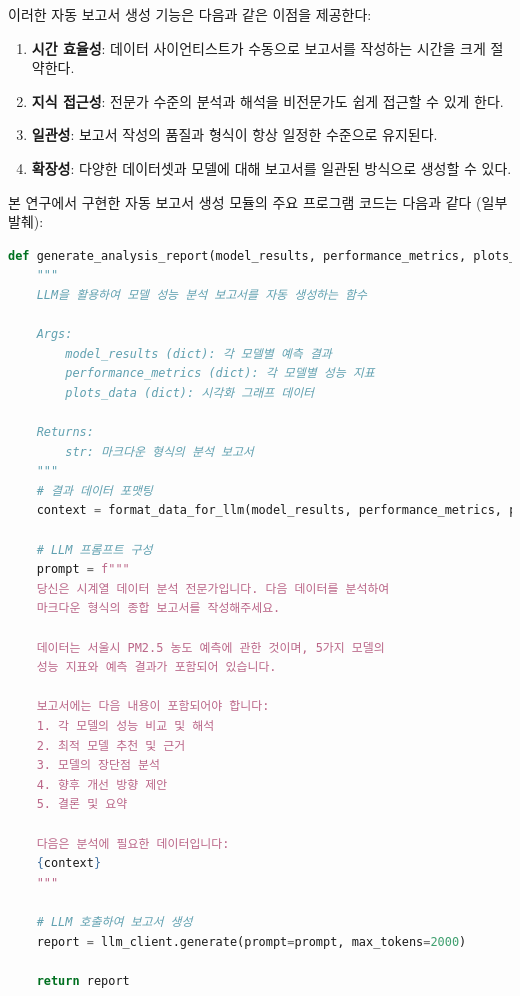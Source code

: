 \documentclass[12pt,ko,a4,]{report}
\begin{document}
이러한 자동 보고서 생성 기능은 다음과 같은 이점을 제공한다:

\begin{enumerate}
\def\labelenumi{\arabic{enumi}.}
\item
  \textbf{시간 효율성}: 데이터 사이언티스트가 수동으로 보고서를 작성하는
  시간을 크게 절약한다.
\item
  \textbf{지식 접근성}: 전문가 수준의 분석과 해석을 비전문가도 쉽게
  접근할 수 있게 한다.
\item
  \textbf{일관성}: 보고서 작성의 품질과 형식이 항상 일정한 수준으로
  유지된다.
\item
  \textbf{확장성}: 다양한 데이터셋과 모델에 대해 보고서를 일관된
  방식으로 생성할 수 있다.
\end{enumerate}

본 연구에서 구현한 자동 보고서 생성 모듈의 주요 프로그램 코드는 다음과
같다 (일부 발췌):

\begin{lstlisting}[language=Python]
def generate_analysis_report(model_results, performance_metrics, plots_data):
    """
    LLM을 활용하여 모델 성능 분석 보고서를 자동 생성하는 함수
    
    Args:
        model_results (dict): 각 모델별 예측 결과
        performance_metrics (dict): 각 모델별 성능 지표
        plots_data (dict): 시각화 그래프 데이터
        
    Returns:
        str: 마크다운 형식의 분석 보고서
    """
    # 결과 데이터 포맷팅
    context = format_data_for_llm(model_results, performance_metrics, plots_data)
    
    # LLM 프롬프트 구성
    prompt = f"""
    당신은 시계열 데이터 분석 전문가입니다. 다음 데이터를 분석하여 
    마크다운 형식의 종합 보고서를 작성해주세요.
    
    데이터는 서울시 PM2.5 농도 예측에 관한 것이며, 5가지 모델의 
    성능 지표와 예측 결과가 포함되어 있습니다.
    
    보고서에는 다음 내용이 포함되어야 합니다:
    1. 각 모델의 성능 비교 및 해석
    2. 최적 모델 추천 및 근거
    3. 모델의 장단점 분석
    4. 향후 개선 방향 제안
    5. 결론 및 요약
    
    다음은 분석에 필요한 데이터입니다:
    {context}
    """
    
    # LLM 호출하여 보고서 생성
    report = llm_client.generate(prompt=prompt, max_tokens=2000)
    
    return report
\end{lstlisting}
\end{document}
